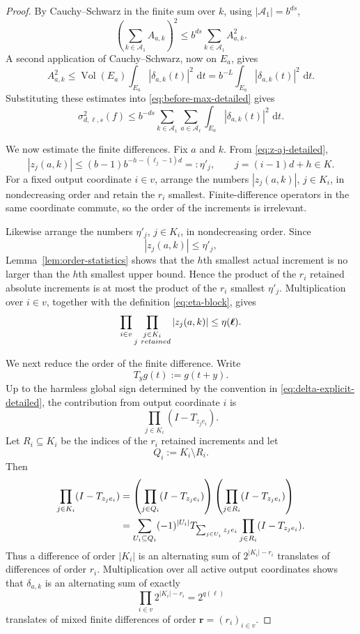 \documentclass[10pt,a4paper]{amsart}
\newcommand{\Vol}{\operatorname{Vol}}
\newcommand{\dd}{\,\mathrm d}
\begin{document}
\begin{proof}
By Cauchy--Schwarz in the finite sum over $k$, using
$|\mathcal A_1|=b^{ds}$,
\[
 \left(
   \sum_{k\in\mathcal A_1}A_{a,k}
 \right)^2
 \le
 b^{ds}\sum_{k\in\mathcal A_1}A_{a,k}^2.
\]
A second application of Cauchy--Schwarz, now on $E_a$, gives
\[
 A_{a,k}^2
 \le
 \Vol(E_a)
 \int_{E_a}|\delta_{a,k}(t)|^2\,\dd t
 =
 b^{-L}
 \int_{E_a}|\delta_{a,k}(t)|^2\,\dd t.
\]
Substituting these estimates into
\eqref{eq:before-max-detailed} gives
\begin{equation}\label{eq:block-L2-reduction-detailed}
 \sigma_{d,\boldsymbol\ell,s}^2(f)
 \le
 b^{-ds}
 \sum_{k\in\mathcal A_1}
 \sum_{a\in\mathcal A_{\boldsymbol\ell}}
 \int_{E_a}|\delta_{a,k}(t)|^2\,\dd t.
\end{equation}

We now estimate the finite differences.  Fix $a$ and $k$.
From \eqref{eq:z-aj-detailed},
\[
 |z_j(a,k)|
 \le
 (b-1)b^{-h-(\ell_j-1)d}
 =:\eta'_j,
 \qquad
 j=(i-1)d+h\in K.
\]
For a fixed output coordinate $i\in v$, arrange the numbers
$|z_j(a,k)|$, $j\in K_i$, in nondecreasing order and retain the
$r_i$ smallest.  Finite-difference operators in the same coordinate
commute, so the order of the increments is irrelevant.

Likewise arrange the numbers $\eta'_j$, $j\in K_i$, in
nondecreasing order.  Since
\[
 |z_j(a,k)|\le\eta'_j,
\]
Lemma~\ref{lem:order-statistics} shows that the $h$th smallest actual
increment is no larger than the $h$th smallest upper bound.  Hence
the product of the $r_i$ retained absolute increments is at most
the product of the $r_i$ smallest $\eta'_j$.  Multiplication over
$i\in v$, together with the definition \eqref{eq:eta-block}, gives
\begin{equation}\label{eq:retained-product-detailed}
 \prod_{i\in v}
 \prod_{\substack{j\in K_i\\ j\ {\rm retained}}}
 |z_j(a,k)|
 \le
 \eta(\boldsymbol\ell).
\end{equation}

We next reduce the order of the finite difference.  Write
\[
 T_yg(t):=g(t+y).
\]
Up to the harmless global sign determined by the convention in
\eqref{eq:delta-explicit-detailed}, the contribution from output
coordinate $i$ is
\[
 \prod_{j\in K_i}(I-T_{z_j e_i}).
\]
Let $R_i\subseteq K_i$ be the indices of the $r_i$ retained
increments and let
\[
 Q_i:=K_i\setminus R_i.
\]
Then
\begin{align}
 \prod_{j\in K_i}(I-T_{z_j e_i})
 &=
 \left(
   \prod_{j\in Q_i}(I-T_{z_j e_i})
 \right)
 \left(
   \prod_{j\in R_i}(I-T_{z_j e_i})
 \right)
 \notag\\
 &=
 \sum_{U_i\subseteq Q_i}
 (-1)^{|U_i|}
 T_{\sum_{j\in U_i}z_j e_i}
 \prod_{j\in R_i}(I-T_{z_j e_i}).
 \label{eq:difference-reduction-detailed}
\end{align}
Thus a difference of order $|K_i|$ is an alternating sum of
$2^{|K_i|-r_i}$ translates of differences of order $r_i$.
Multiplication over all active output coordinates shows that
$\delta_{a,k}$ is an alternating sum of exactly
\[
 \prod_{i\in v}2^{|K_i|-r_i}
 =
 2^{q(\boldsymbol\ell)}
\]
translates of mixed finite differences of order
$\boldsymbol r=(r_i)_{i\in v}$.


\end{proof}
\end{document}
